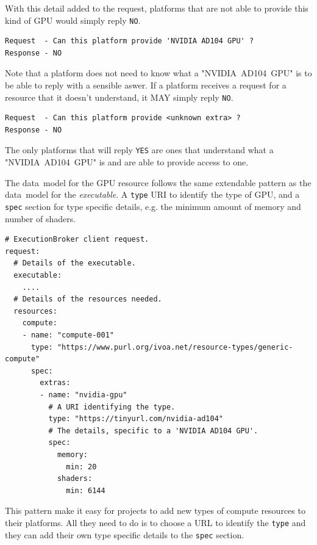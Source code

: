 \documentclass[11pt,a4paper]{ivoa}
\newcommand{\datamodel} {data~model}
\newcommand{\codeword}[1] {\texttt{#1}}
\newcommand{\executable} {\textit{executable}}
\newcommand{\gpu}[1] {GPU#1}
\newcommand{\nvidiagpu} {NVIDIA~AD104~GPU}
\begin{document}
With this detail added to the request, platforms that are not able to provide this kind of \gpu{}
would simply reply \codeword{NO}.

\begin{lstlisting}[]
Request  - Can this platform provide 'NVIDIA AD104 GPU' ?
Response - NO
\end{lstlisting}

Note that a platform does not need to know what a  "\nvidiagpu{}" is to be able to reply with a sensible aswer.
If a platform receives a request for a resource that it doesn't understand, it MAY simply reply \codeword{NO}.

\begin{lstlisting}[]
Request  - Can this platform provide <unknown extra> ?
Response - NO
\end{lstlisting}

The only platforms that will reply \codeword{YES} are ones that understand what a "\nvidiagpu{}"
is and are able to provide access to one.

The \datamodel{} for the \gpu{} resource follows the same extendable pattern as the \datamodel{} for
the \executable{}. A \codeword{type} URI to identify the type of \gpu{},
and a \codeword{spec} section for type specific details,
e.g. the minimum amount of memory and number of shaders.

\begin{lstlisting}[]
# ExecutionBroker client request.
request:
  # Details of the executable.
  executable:
    ....
  # Details of the resources needed.
  resources:
    compute:
    - name: "compute-001"
      type: "https://www.purl.org/ivoa.net/resource-types/generic-compute"
      spec:
        extras:
        - name: "nvidia-gpu"
          # A URI identifying the type.
          type: "https://tinyurl.com/nvidia-ad104"
          # The details, specific to a 'NVIDIA AD104 GPU'.
          spec:
            memory:
              min: 20
            shaders:
              min: 6144
\end{lstlisting}

This pattern make it easy for projects to add new types of compute resources to their
platforms. All they need to do is to choose a URL to identify the \codeword{type}
and they can add their own type specific details to the \codeword{spec} section.
\end{document}
